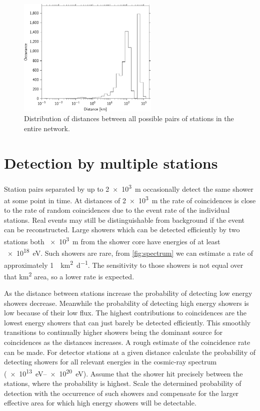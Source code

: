 \begin{figure}
    \centering
    \includegraphics[width=0.6\textwidth]
                    {plots/cluster/station_distances_all}
    \caption{Distribution of distances between all possible pairs of stations in the entire \hisparc network.}
    \label{fig:station_distances_all}
\end{figure}


\section{Detection by multiple stations}

Station pairs separated by up to \SI{2e3}{\meter} occasionally detect the same shower at some point in time. At distances of \SI{2e3}{\meter} the rate of coincidences is close to the rate of random coincidences due to the event rate of the individual stations. Real events may still be distinguishable from background if the event can be reconstructed. Large showers which can be detected efficiently by two stations both \SI{e3}{\meter} from the shower core have energies of at least \SI{e18}{\eV}. Such showers are rare, from \cref{fig:spectrum} we can estimate a rate of approximately \SI{1}{\per\kilo\meter\squared\per\day}. The sensitivity to those showers is not equal over that \si{\kilo\meter\squared} area, so a lower rate is expected.

As the distance between stations increase the probability of detecting low energy showers decrease. Meanwhile the probability of detecting high energy showers is low because of their low flux. The highest contributions to coincidences are the lowest energy showers that can just barely be detected efficiently. This smoothly transitions to continually higher showers being the dominant source for coincidences as the distances increases. A rough estimate of the coincidence rate can be made. For detector stations at a given distance calculate the probability of detecting showers for all relevant energies in the cosmic-ray spectrum (\SIrange{e13}{e20}{\eV}). Assume that the shower hit precisely between the stations, where the probability is highest. Scale the determined probability of detection with the occurrence of such showers and compensate for the larger effective area for which high energy showers will be detectable.

